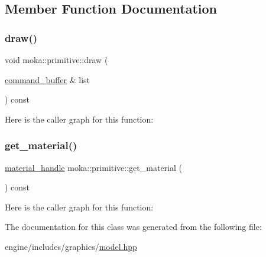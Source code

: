 \subsection{Member Function Documentation}
\mbox{\label{classmoka_1_1primitive_aed9c45c5844f61180db3500ae4fd8cf6}} 
\subsubsection{\texorpdfstring{draw()}{draw()}}
{\footnotesize\ttfamily void moka\+::primitive\+::draw (\begin{DoxyParamCaption}\item[{\mbox{\hyperlink{classmoka_1_1command__buffer}{command\+\_\+buffer}} \&}]{list }\end{DoxyParamCaption}) const}

Here is the caller graph for this function\+:
\mbox{\label{classmoka_1_1primitive_a0cd9192d639d8ff180016c7102361440}} 
\subsubsection{\texorpdfstring{get\_material()}{get\_material()}}
{\footnotesize\ttfamily \mbox{\hyperlink{structmoka_1_1material__handle}{material\+\_\+handle}} moka\+::primitive\+::get\+\_\+material (\begin{DoxyParamCaption}{ }\end{DoxyParamCaption}) const}

Here is the caller graph for this function\+:


The documentation for this class was generated from the following file\+:\begin{DoxyCompactItemize}
\item 
engine/includes/graphics/\mbox{\hyperlink{model_8hpp}{model.\+hpp}}\end{DoxyCompactItemize}
